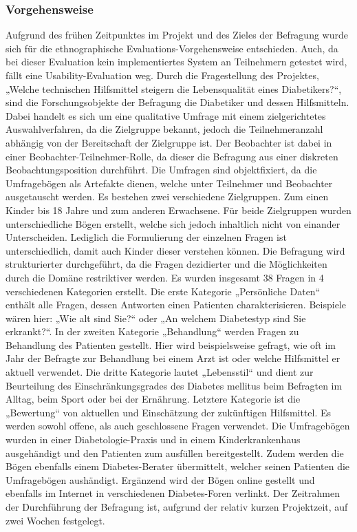 \documentclass[a4paper,11pt]{article}%
\renewcommand{\\}{\vspace*{0.5\baselineskip} \newline}
\begin{document}
\subsubsection{Vorgehensweise}
	Aufgrund des frühen Zeitpunktes im Projekt und des Zieles der Befragung wurde sich für die ethnographische Evaluations-Vorgehensweise entschieden. Auch, da bei dieser Evaluation kein implementiertes System an Teilnehmern getestet wird, fällt eine Usability-Evaluation weg. Durch die Fragestellung des Projektes, „Welche technischen Hilfsmittel steigern die Lebensqualität eines Diabetikers?“, sind die Forschungsobjekte der Befragung die Diabetiker und dessen Hilfsmitteln. Dabei handelt es sich um eine qualitative Umfrage mit einem zielgerichtetes Auswahlverfahren, da die Zielgruppe bekannt, jedoch die Teilnehmeranzahl abhängig von der Bereitschaft der Zielgruppe ist. Der Beobachter ist dabei in einer Beobachter-Teilnehmer-Rolle, da dieser die Befragung aus einer diskreten Beobachtungsposition durchführt. Die Umfragen sind objektfixiert, da die Umfragebögen als Artefakte dienen, welche unter Teilnehmer und Beobachter ausgetauscht werden.\newline
	Es bestehen zwei verschiedene Zielgruppen. Zum einen Kinder bis 18 Jahre und zum anderen Erwachsene. Für beide Zielgruppen wurden unterschiedliche Bögen erstellt, welche sich jedoch inhaltlich nicht von einander Unterscheiden. Lediglich die Formulierung der einzelnen Fragen ist unterschiedlich, damit auch Kinder dieser verstehen können.\newline
	Die Befragung wird strukturierter durchgeführt, da die Fragen dezidierter und die Möglichkeiten durch die Domäne restriktiver werden. Es wurden insgesamt 38 Fragen in 4 verschiedenen Kategorien erstellt. Die erste Kategorie „Persönliche Daten“ enthält alle Fragen, dessen Antworten einen Patienten charakterisieren.\newline
	Beispiele wären hier: „Wie alt sind Sie?“ oder „An welchem Diabetestyp sind Sie erkrankt?“. In der zweiten Kategorie „Behandlung“ werden Fragen zu Behandlung des Patienten gestellt. Hier wird beispielsweise gefragt, wie oft im Jahr der Befragte zur Behandlung bei einem Arzt ist oder welche Hilfsmittel er aktuell verwendet. Die dritte Kategorie lautet „Lebensstil“ und dient zur Beurteilung des Einschränkungsgrades des Diabetes mellitus beim Befragten im Alltag, beim Sport oder bei der Ernährung. Letztere Kategorie ist die „Bewertung“ von aktuellen und Einschätzung der zukünftigen Hilfsmittel.\newline
	Es werden sowohl offene, als auch geschlossene Fragen verwendet. Die Umfragebögen wurden in einer Diabetologie-Praxis und in einem Kinderkrankenhaus ausgehändigt und den Patienten zum ausfüllen bereitgestellt. Zudem werden die Bögen
	ebenfalls einem Diabetes-Berater übermittelt, welcher seinen Patienten die Umfragebögen aushändigt. Ergänzend wird der Bögen online gestellt und ebenfalls im Internet in verschiedenen Diabetes-Foren verlinkt. Der Zeitrahmen der Durchführung der Befragung ist, aufgrund der relativ kurzen Projektzeit, auf zwei Wochen festgelegt.
\end{document}
